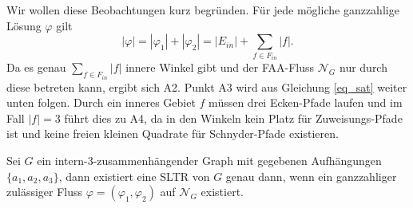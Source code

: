 Wir wollen diese Beobachtungen kurz begründen. Für jede mögliche ganzzahlige Lösung $\varphi$ gilt $$|\varphi|=|\varphi_1|+|\varphi_2| = |E_{in}| + \sum_{f \in F_{in}} |f|.$$
Da es genau $\sum_{f \in F_{in}} |f|$ innere Winkel gibt und der FAA-Fluss $\mathcal{N}_G$ nur durch diese betreten kann, ergibt sich A2. Punkt A3 wird aus Gleichung \ref{eq_sat} weiter unten folgen. Durch ein inneres Gebiet $f$ müssen drei Ecken-Pfade laufen und im Fall $|f|=3$ führt dies zu A4, da in den Winkeln kein Platz für Zuweisungs-Pfade ist und keine freien kleinen Quadrate für Schnyder-Pfade existieren.

\begin{theorem}\label{theo_algo}
Sei $G$ ein intern-3-zusammenhängender Graph mit gegebenen Aufhängungen $\{a_1,a_2,a_3\}$, dann existiert eine SLTR von $G$ genau dann, wenn ein ganzzahliger zulässiger Fluss $\varphi=(\varphi_1,\varphi_2)$ auf $\mathcal{N}_G$ existiert.
\end{theorem}


